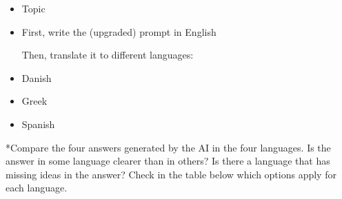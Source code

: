 \documentclass[12pt]{article}
\makeatletter
\newcounter{question}
\newlength\questionheight
\newcommand{\question}{\@ifstar{\question@text}{\question@field}}
\newcommand{\question@heading}[1]{%
  \refstepcounter{question}%
  \vspace{0.3cm}%
  \noindent\textbf{\faEdit\ Question \thequestion: #1}%
}
\newcommand{\question@text}[1]{%
  \question@heading{#1}%
}
\newcommand{\question@field}[2][\questionheight]{%
  \question@heading{#2}%
 \\[0.3em] \begin{Form}
    \TextField[
      name=Q\thequestion,
      multiline=true,
      width=\linewidth,
      height=#1,
      charsize=10pt,
      bordercolor={0 0 0},
      borderwidth=1.8,
      backgroundcolor={1 1 1}
    ]{}
  \end{Form}
  \vspace{0.3cm}%
}
\makeatother
\begin{document}
\begin{Form}
\begin{itemize}
\item Topic \\ [0.2cm]
\TextField[name=topicEU,width=\linewidth,height=0.6cm,multiline=true, bordercolor={0 0 0}]{}

    \item First, write the (upgraded) prompt in English \\ [0.2cm]
\TextField[name=languageone,width=\linewidth,height=4cm,multiline=true, bordercolor={0 0 0}]{}

Then, translate it to different languages:

    \item Danish \\[0.2cm]
    \TextField[name=languagetwo,width=\linewidth,height=4cm,multiline=true, bordercolor={0 0 0}]{}
    
    \item Greek\\[0.2cm]
    \TextField[name=languagethree,width=\linewidth,height=4cm,multiline=true, bordercolor={0 0 0}]{}

    \item Spanish \\[0.2cm]
    \TextField[name=languagefour,width=\linewidth,height=4cm,multiline=true, bordercolor={0 0 0}]{}
\end{itemize}

\end{Form}

\question*{Compare the four answers generated by the AI in the four languages. Is the answer in some language clearer than in others? Is there a language that has missing ideas in the answer? Check in the table below which options apply for each language. 
}
\end{document}
